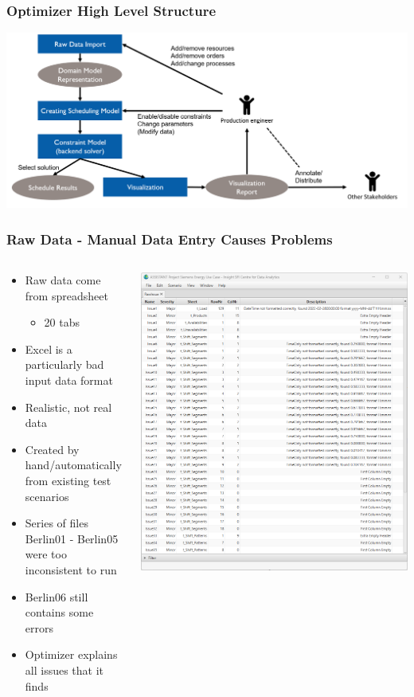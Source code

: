 \documentclass[dvipsnames,aspectratio=169]{beamer}
\begin{document}
\begin{frame}
\frametitle{Optimizer High Level Structure}
\includegraphics[width=.9\textwidth]{images/overview}
\end{frame}

\begin{frame}
\frametitle{Raw Data - Manual Data Entry Causes Problems}
\begin{columns}
\begin{column}{0.5\textwidth}
\begin{itemize}
\item Raw data come from spreadsheet
\begin{itemize}
\item 20 tabs
\end{itemize}
\item Excel is a particularly bad input data format
\item Realistic, not real data
\item Created by hand/automatically from existing test scenarios
\item Series of files Berlin01 - Berlin05 were too inconsistent to run
\item Berlin06 still contains some errors
\item Optimizer explains all issues that it finds
\end{itemize}
\end{column}
\begin{column}{0.5\textwidth}
\includegraphics[width=.85\textwidth]{images/rawerror}

\end{column}
\end{columns}
\end{frame}
\end{document}
